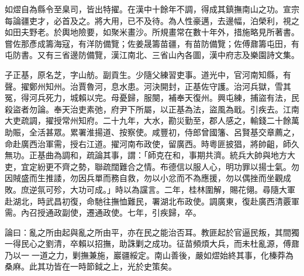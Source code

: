 \begin{pinyinscope}
如熤自為縣令至臬司，皆出特擢。在漢中十餘年不調，得成其鎮撫南山之功。宣宗每論疆吏才，必首及之。將大用，已不及待。為人性豪邁，去邊幅，泊榮利，視之如田夫野老。於輿地險要，如聚米畫沙。所規畫常在數十年外，措施略見所著書。嘗佐那彥成籌海寇，有洋防備覽；佐姜晟籌苗疆，有苗防備覽；佐傅鼐籌屯田，有屯防書。又有三省邊防備覽，漢江南北、三省山內各圖，漢中府志及樂園詩文集。

子正基，原名芝，字山舫。副貢生。少隨父練習吏事。道光中，官河南知縣，有聲。擢鄭州知州。治賈魯河，息水患。河決開封，正基佐守護。治河兵獄，雪其冤，得河兵死力，城賴以完。母憂歸，服闋，補奉天復州。興屯練，捕盜有法，民殺盜者勿論。奉天治吏素弛，府尹下所屬，以正基為法，盜風為戢。引疾去。江南大吏疏調，擢授常州知府。二十九年，大水，勘災勤至，郡人感之，輸錢二十餘萬助賑，全活甚眾。累署淮揚道、按察使。咸豐初，侍郎曾國籓、呂賢基交章薦之，命赴廣西治軍需，授右江道。擢河南布政使，留廣西。時粵匪披猖，將帥齟，師久無功。正基曲為調和，疏論其事，謂：「師克在和，事期共濟。統兵大帥與地方大吏，宜定紛更不齊之勢，聯疏闊難合之情。布德信以服人心，明功罪以揚士氣。勿因賊盛而生推諉，勿因兵單而務自救，勿以小忿而不為應援，勿以偶挫而坐觀成敗。庶逆氛可殄，大功可成。」時以為讜言。二年，桂林圍解，賜花翎。尋隨大軍赴湖北，時武昌初復，命馳往撫恤難民，署湖北布政使。調廣東，復赴廣西清覈軍需。內召授通政副使，遷通政使。七年，引疾歸，卒。

論曰：亂之所由起與亂之所由平，亦在民之能治否耳。教匪起於官逼民叛，其間獨一得民心之劉清，卒賴以招撫，助誅剿之成功。征苗頻煩大兵，而未杜亂源，傅鼐乃以一一道之力，剿撫兼施，巖疆綏定。南山善後，嚴如熤始終其事，化榛莽為桑麻。此其功皆在一時節鉞之上，光於史策矣。


\end{pinyinscope}